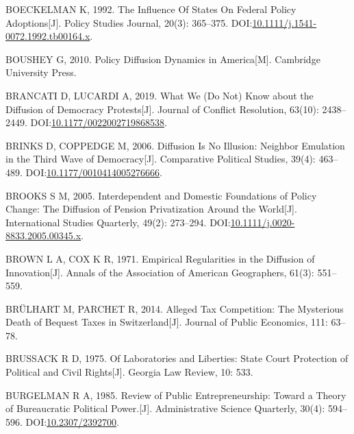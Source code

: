 \documentclass[
  12pt,
]{ctexart}
\newlength{\cslhangindent}
\newlength{\cslentryspacingunit} %
\newenvironment{CSLReferences}[2] %
 {%
  \setlength{\parindent}{0pt}
  \ifodd #1
  \let\oldpar\par
  \def\par{\hangindent=\cslhangindent\oldpar}
  \fi
  \setlength{\parskip}{#2\cslentryspacingunit}
 }%
 {}
\begin{document}
\begin{CSLReferences}{1}{0}
\leavevmode{}%
BOECKELMAN K, 1992. The {Influence Of States On Federal Policy Adoptions}{[}J{]}. Policy Studies Journal, 20(3): 365--375. DOI:\href{https://doi.org/10.1111/j.1541-0072.1992.tb00164.x}{10.1111/j.1541-0072.1992.tb00164.x}.

\leavevmode{}%
BOUSHEY G, 2010. Policy Diffusion Dynamics in {America}{[}M{]}. {Cambridge University Press}.

\leavevmode{}%
BRANCATI D, LUCARDI A, 2019. What {We} ({Do Not}) {Know} about the {Diffusion} of {Democracy Protests}{[}J{]}. Journal of Conflict Resolution, 63(10): 2438--2449. DOI:\href{https://doi.org/10.1177/0022002719868538}{10.1177/0022002719868538}.

\leavevmode{}%
BRINKS D, COPPEDGE M, 2006. Diffusion {Is No Illusion}: {Neighbor Emulation} in the {Third Wave} of {Democracy}{[}J{]}. Comparative Political Studies, 39(4): 463--489. DOI:\href{https://doi.org/10.1177/0010414005276666}{10.1177/0010414005276666}.

\leavevmode{}%
BROOKS S M, 2005. Interdependent and {Domestic Foundations} of {Policy Change}: {The Diffusion} of {Pension Privatization Around} the {World}{[}J{]}. International Studies Quarterly, 49(2): 273--294. DOI:\href{https://doi.org/10.1111/j.0020-8833.2005.00345.x}{10.1111/j.0020-8833.2005.00345.x}.

\leavevmode{}%
BROWN L A, COX K R, 1971. Empirical Regularities in the Diffusion of Innovation{[}J{]}. Annals of the Association of American Geographers, 61(3): 551--559.

\leavevmode{}%
BRÜLHART M, PARCHET R, 2014. Alleged Tax Competition: {The} Mysterious Death of Bequest Taxes in {Switzerland}{[}J{]}. Journal of Public Economics, 111: 63--78.

\leavevmode{}%
BRUSSACK R D, 1975. Of {Laboratories} and {Liberties}: {State Court Protection} of {Political} and {Civil Rights}{[}J{]}. Georgia Law Review, 10: 533.

\leavevmode{}%
BURGELMAN R A, 1985. Review of {Public Entrepreneurship}: {Toward} a {Theory} of {Bureaucratic Political Power}.{[}J{]}. Administrative Science Quarterly, 30(4): 594--596. DOI:\href{https://doi.org/10.2307/2392700}{10.2307/2392700}.


\end{CSLReferences}
\end{document}
